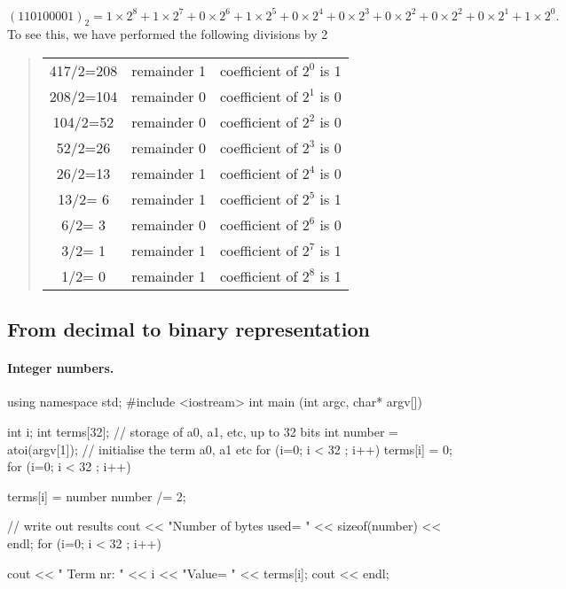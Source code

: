 \documentclass[%
oneside,                 %
final,                   %
10pt]{article}
\begin{document}
{\[
(110100001)_2
=1\times2^8+1\times 2^{7}+0\times 2^{6}+1\times 2^{5}+0\times 2^{4}+0\times 2^{3}+0\times 2^{2}+0\times 2^{2}+0\times 2^{1}+1\times 2^{0}.
\]
To see this, we have performed the following divisions by 2




\begin{quote}
\begin{tabular}{ccc}
\hline
 \\
\hline
417/2=208 & remainder 1 & coefficient of $2^{0}$ is 1 \\
208/2=104 & remainder 0 & coefficient of $2^{1}$ is 0 \\
104/2=52  & remainder 0 & coefficient of $2^{2}$ is 0 \\
52/2=26   & remainder 0 & coefficient of $2^{3}$ is 0 \\
26/2=13   & remainder 1 & coefficient of $2^{4}$ is 0 \\
13/2= 6   & remainder 1 & coefficient of $2^{5}$ is 1 \\
6/2= 3    & remainder 0 & coefficient of $2^{6}$ is 0 \\
3/2= 1    & remainder 1 & coefficient of $2^{7}$ is 1 \\
1/2= 0    & remainder 1 & coefficient of $2^{8}$ is 1 \\
\hline
\end{tabular}
\end{quote}

\noindent



\subsection{From decimal to binary representation}


\paragraph{Integer numbers.}
\bcppcod
using namespace std;
#include <iostream>
int main (int argc, char* argv[])
{
  int i;
  int terms[32]; // storage of a0, a1, etc, up to 32 bits
  int number = atoi(argv[1]);
  // initialise the term a0, a1 etc
  for (i=0; i < 32 ; i++){ terms[i] = 0;}
  for (i=0; i < 32 ; i++){
    terms[i] = number%
    number /= 2;

  // write out results
  cout << "Number of bytes used= " << sizeof(number) << endl;
  for (i=0; i < 32 ; i++){
    cout << " Term nr: " << i << "Value= " << terms[i];
    cout << endl;

}}}}
\end{document}
